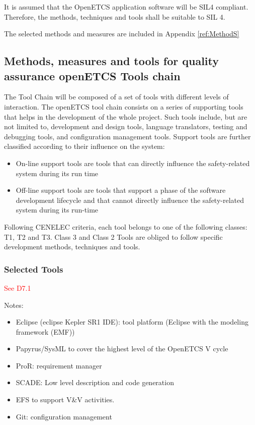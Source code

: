 \documentclass{template/openetcs_article}
\begin{document}
It is assumed that the OpenETCS application software will be \gls{SIL}4 compliant. Therefore, the methods, techniques and tools shall be suitable to \gls{SIL} 4. 

The selected methods and measures are included in Appendix  \ref{ref:MethodS}

\subsection{Methods, measures and tools for quality assurance openETCS Tools chain}

The Tool Chain will be composed of a set of tools with different levels of interaction. The openETCS tool chain consists on a series of supporting tools that helps in the development of the whole project. Such tools include, but are not limited to, development and design tools, language translators, testing and debugging tools, and configuration management tools. Support tools are further classified according to their influence on the system:
\begin{itemize}
\item On-line support tools are tools that can directly influence the safety-related system during its run time
\item Off-line support tools are tools that support a phase of the software development lifecycle and that cannot directly influence the safety-related system during its run-time
\end{itemize}

Following CENELEC criteria, each tool belongs to one of the following classes: T1, T2 and T3. Class 3 and Class 2 Tools are obliged to follow specific development methods, techniques and tools. 


\subsubsection{Selected Tools}
\textcolor{red}{See D7.1}

Notes:
\begin{itemize}
\item Eclipse (eclipse Kepler SR1 IDE): tool platform (Eclipse with the modeling framework (EMF))
\item Papyrus/SysML to cover the highest level of the OpenETCS V cycle
\item ProR: requirement manager
\item SCADE: Low level description and code generation
\item EFS to support V\&V activities.
\item Git: configuration management
\end{itemize}
\end{document}
